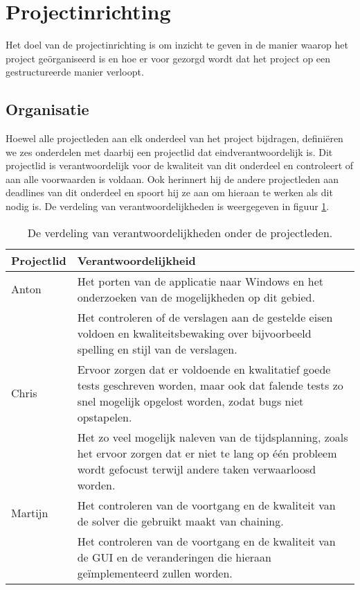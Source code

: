 \section{Projectinrichting}
Het doel van de projectinrichting is om inzicht te geven in de manier waarop het project ge\"organiseerd is en hoe er voor gezorgd wordt dat het project op een gestructureerde manier verloopt.

\subsection{Organisatie}
Hoewel alle projectleden aan elk onderdeel van het project bijdragen, definiëren we zes onderdelen met daarbij een projectlid dat eindverantwoordelijk is. Dit projectlid is verantwoordelijk voor de kwaliteit van dit onderdeel en controleert of aan alle voorwaarden is voldaan. Ook herinnert hij de andere projectleden aan deadlines van dit onderdeel en spoort hij ze aan om hieraan te werken als dit nodig is. De verdeling van verantwoordelijkheden is weergegeven in figuur \ref{fig:organisatie}.

\begin{table}[!h]
\label{fig:organisatie}
\def\arraystretch{1.5}
\begin{tabularx}{\textwidth}{|p{2cm}|X|}
\hline
\textbf{Projectlid} & \textbf{Verantwoordelijkheid} \\ \hline
Anton & Het porten van de applicatie naar Windows en het onderzoeken van de mogelijkheden op dit gebied. \\ \cline{2-2}
 & Het controleren of de verslagen aan de gestelde eisen voldoen en kwaliteitsbewaking over bijvoorbeeld spelling en stijl van de verslagen. \\ \hline
Chris & Ervoor zorgen dat er voldoende en kwalitatief goede tests geschreven worden, maar ook dat falende tests zo snel mogelijk opgelost worden, zodat bugs niet opstapelen. \\ \cline{2-2}
 & Het zo veel mogelijk naleven van de tijdsplanning, zoals het ervoor zorgen dat er niet te lang op één probleem wordt gefocust terwijl andere taken verwaarloosd worden. \\ \hline
Martijn & Het controleren van de voortgang en de kwaliteit van de solver die gebruikt maakt van chaining. \\ \cline{2-2}
 & Het controleren van de voortgang en de kwaliteit van de GUI en de veranderingen die hieraan geïmplementeerd zullen worden. \\ \hline
\end{tabularx}
\caption{De verdeling van verantwoordelijkheden onder de projectleden.}
\end{table}

